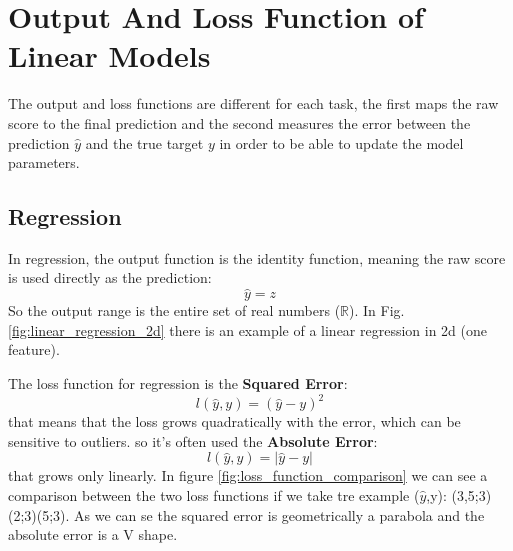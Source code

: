 \section{Output And Loss Function of Linear Models}
The output and loss functions are different for each task, the first maps the raw score to the final 
prediction and the second measures the error between the prediction $\hat{y}$ and the true target $y$
in order to be able to update the model parameters. 

\subsection{Regression}
In regression, the output function is the identity function, meaning the raw score is used directly 
as the prediction:
\begin{equation}
    \hat{y} = z
\end{equation}
So the output range is the entire set of real numbers ($\mathbb{R}$). In Fig. \ref{fig:linear_regression_2d}
there is an example of a linear regression in 2d (one feature).

\newline
The loss function for regression is the \textbf{Squared Error}:
\begin{equation}
    l(\hat{y}, y) = (\hat{y} - y)^2
\end{equation}
that means that the loss grows quadratically with the error, which can be sensitive to outliers.
\newline
so it's often used the \textbf{Absolute Error}:
\begin{equation}
    l(\hat{y}, y) = |\hat{y} - y|
\end{equation}
that grows only linearly.
\newline
In figure \ref{fig:loss_function_comparison} we can see a comparison between the two loss functions
if we take tre example ($\hat{y}$,y): (3,5;3)(2;3)(5;3). As we can se the squared error is geometrically
a parabola and the absolute error is a V shape.
